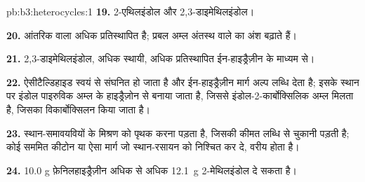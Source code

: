 \begin{solution}{pb:b3:heterocycles:1}
\textbf{19.} 2-एथिलइंडोल और 2,3-डाइमेथिलइंडोल।

\textbf{20.} आंतरिक वाला अधिक प्रतिस्थापित है; प्रबल अम्ल अंतस्थ वाले का
अंश बढ़ाते हैं।

\textbf{21.} 2,3-डाइमेथिलइंडोल, अधिक स्थायी, अधिक प्रतिस्थापित
ईन-हाइड्रैज़ीन के माध्यम से।

\textbf{22.} ऐसीटैल्डिहाइड स्वयं से संघनित हो जाता है और ईन-हाइड्रैज़ीन मार्ग अल्प
लब्धि देता है; इसके स्थान पर इंडोल पाइरुविक अम्ल के हाइड्रैज़ोन से बनाया जाता है, जिससे
इंडोल-2-कार्बोक्सिलिक अम्ल मिलता है, जिसका विकार्बोक्सिलन किया जाता है।

\textbf{23.} स्थान-समावयवियों के मिश्रण को पृथक करना पड़ता है, जिसकी कीमत लब्धि से चुकानी पड़ती है;
कोई सममित कीटोन या ऐसा मार्ग जो स्थान-रसायन को निश्चित कर दे, वरीय होता है।

\textbf{24.} 10.0 g फ़ेनिलहाइड्रैज़ीन अधिक से अधिक \qty{12.1}{g} 2-मेथिलइंडोल दे सकता है।
\end{solution}
